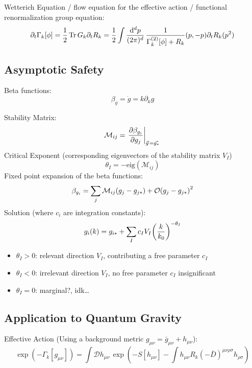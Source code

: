 		\noindent
		Wetterich Equation / flow equation for the effective action / functional renormalization group equation:
		\begin{equation}
			\partial_t \Gamma_k[\phi] = \frac{1}{2} \Tr G_k \partial_t R_k
			=\frac{1}{2} \int \frac{\dd^d p}{(2\pi)^d} \, \frac{1}{\Gamma^{(2)}_k[\phi] + R_k}(p,-p) \partial_t R_k(p^2)
		\end{equation}

	\subsection{Asymptotic Safety}
		Beta functions:
		\begin{equation}
			\beta_g = \dot{g} = k \partial_k g
		\end{equation}

		\noindent
		Stability Matrix:
		\begin{equation}
			\mathcal{M}_{ij} = \eval{\pdv{\beta_{g_i}}{g_j}}_{\vec{g} = \vec{g_*}}
		\end{equation}
		Critical Exponent (corresponding eigenvectors of the stability matrix $V_I$)
		\begin{equation}
			\theta_I = - \mathrm{eig}(\mathcal{M}_{ij})
		\end{equation}
		Fixed point expansion of the beta functions:
		\begin{equation}
			\beta_{g_i} = \sum_{j} \mathcal{M}_{ij} \qty(g_j - g_{j*}) + \mathcal{O}\qty(g_j - g_{j*})^2
		\end{equation}
		Solution (where $c_i$ are integration constants):
		\begin{equation}
			g_i(k) = g_{i*} + \sum_I c_I V_I \qty(\frac{k}{k_0})^{-\theta_I}
		\end{equation}
		\begin{itemize}
			\item $\theta_I > 0$: relevant direction $V_I$, contributing a free parameter $c_I$
			\item $\theta_I < 0$: irrelevant direction $V_I$, no free parameter $c_I$ insignificant
			\item $\theta_I = 0$: marginal?, idk\dots
		\end{itemize}

	\subsection{Application to Quantum Gravity}
		Effective Action (Using a background metric $g_{\mu\nu} = \bar{g}_{\mu\nu} + h_{\mu\nu}$):
		\begin{equation}
			\exp(-\Gamma_k[g_{\mu\nu}]) = \int \mathcal{D}h_{\mu\nu} \, \exp(-S[h_{\mu\nu}] - \int h_{\mu\nu} R_k(-\bar{D})^{\mu\nu\rho\sigma}h_{\rho\sigma})
		\end{equation}